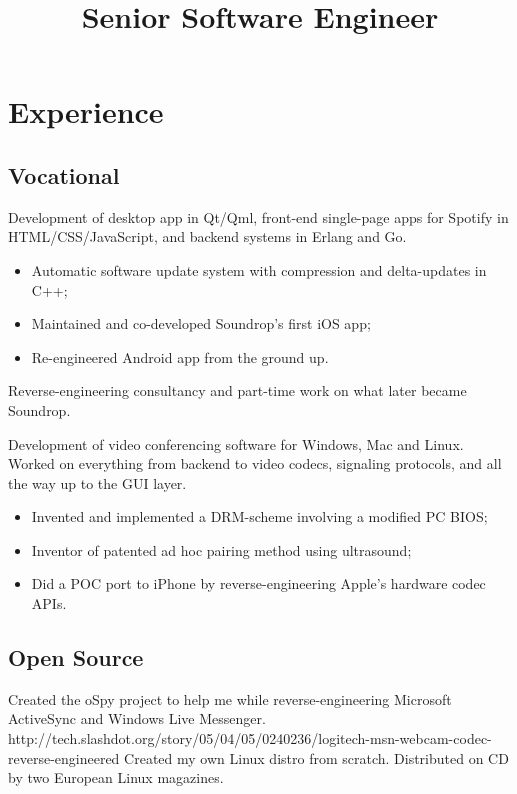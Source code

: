 \documentclass[11pt,a4paper,sans]{moderncv}
\title{Senior Software Engineer}
\begin{document}
\makecvtitle

\section{Experience}
\subsection{Vocational}
{Development of desktop app in Qt/Qml, front-end single-page apps for Spotify
in HTML/CSS/JavaScript, and backend systems in Erlang and Go.
\begin{itemize}
\item Automatic software update system with compression and delta-updates in C++;
\item Maintained and co-developed Soundrop's first iOS app;
\item Re-engineered Android app from the ground up.
\end{itemize}}
{Reverse-engineering consultancy and part-time work on what later became Soundrop.}
{Development of video conferencing software for Windows, Mac and Linux.
Worked on everything from backend to video codecs, signaling protocols, and all
the way up to the GUI layer.
\begin{itemize}
\item Invented and implemented a DRM-scheme involving a modified PC BIOS;
\item Inventor of patented ad hoc pairing method using ultrasound;
\item Did a POC port to iPhone by reverse-engineering Apple's hardware codec APIs.
\end{itemize}}
\subsection{Open Source}
{Created the oSpy project to help me while reverse-engineering Microsoft
ActiveSync and Windows Live Messenger.}
{http://tech.slashdot.org/story/05/04/05/0240236/logitech-msn-webcam-codec-reverse-engineered}
{Created my own Linux distro from scratch. Distributed on CD by two European
Linux magazines.}

\nocite{*}


\end{document}
